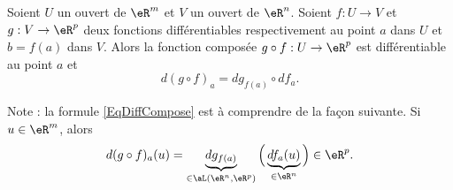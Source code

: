 \begin{proposition}		\label{PropDiffCompose}
Soient $U$ un ouvert de $\eR^m$ et $V$ un ouvert de $\eR^n$. Soient $f: U\to V$  et $g: V \to \eR^p$ deux fonctions différentiables respectivement au point $a$ dans $U$ et $b=f(a)$ dans $V$. Alors la fonction composée $g\circ f: U\to \eR^p $ est différentiable au point $a$ et
\begin{equation}	\label{EqDiffCompose}
    d(g\circ f)_a=dg_{f(a)}\circ df_a.
\end{equation}
\end{proposition}

Note : la formule \eqref{EqDiffCompose} est à comprendre de la façon suivante. Si $u\in\eR^m$, alors
\begin{equation}
    d(g\circ f)_a(u)=\underbrace{dg_{f(a)}}_{\in\aL(\eR^n,\eR^p)}\Big( \underbrace{df_a(u)}_{\in\eR^n} \Big)\in\eR^p.
\end{equation}

